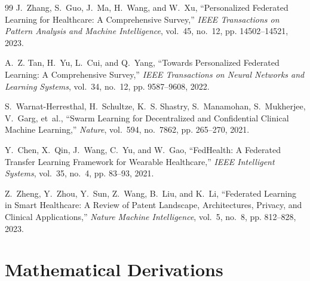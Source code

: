 \documentclass[12pt,a4paper]{report}
\begin{document}
\begin{thebibliography}{99}
J.~Zhang, S.~Guo, J.~Ma, H.~Wang, and W.~Xu,
``Personalized Federated Learning for Healthcare: A Comprehensive Survey,''
\emph{IEEE Transactions on Pattern Analysis and Machine Intelligence}, vol.~45, no.~12, pp. 14502--14521, 2023.

A.~Z. Tan, H.~Yu, L.~Cui, and Q.~Yang,
``Towards Personalized Federated Learning: A Comprehensive Survey,''
\emph{IEEE Transactions on Neural Networks and Learning Systems}, vol.~34, no.~12, pp. 9587--9608, 2022.

S.~Warnat-Herresthal, H.~Schultze, K.~S. Shastry, S.~Manamohan, S.~Mukherjee, V.~Garg, et~al.,
``Swarm Learning for Decentralized and Confidential Clinical Machine Learning,''
\emph{Nature}, vol.~594, no.~7862, pp. 265--270, 2021.

Y.~Chen, X.~Qin, J.~Wang, C.~Yu, and W.~Gao,
``FedHealth: A Federated Transfer Learning Framework for Wearable Healthcare,''
\emph{IEEE Intelligent Systems}, vol.~35, no.~4, pp. 83--93, 2021.

Z.~Zheng, Y.~Zhou, Y.~Sun, Z.~Wang, B.~Liu, and K.~Li,
``Federated Learning in Smart Healthcare: A Review of Patent Landscape, Architectures, Privacy, and Clinical Applications,''
\emph{Nature Machine Intelligence}, vol.~5, no.~8, pp. 812--828, 2023.

\end{thebibliography}

\newpage
\appendix
\chapter{Mathematical Derivations}
\label{app:math_derivations}
\end{document}
